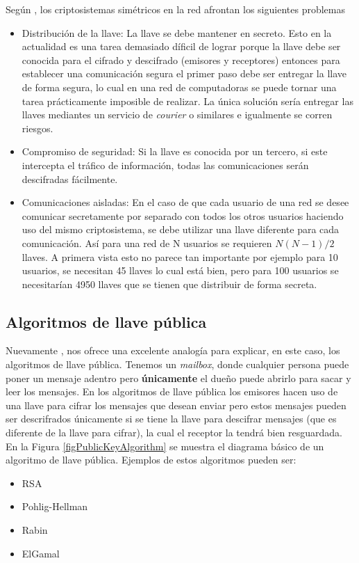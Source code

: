 Según \cite{bruce}, los criptosistemas simétricos en la red afrontan los siguientes problemas
\begin{itemize}
\item Distribución de la llave: La llave se debe mantener en secreto. Esto en la actualidad es una tarea demasiado díficil de lograr porque la llave debe ser conocida para el cifrado y descifrado (emisores y receptores) entonces para establecer una comunicación segura el primer paso debe ser entregar la llave de forma segura, lo cual en una red de computadoras se puede tornar una tarea prácticamente imposible de realizar. La única solución sería entregar las llaves mediantes un servicio de \textit{courier} o similares e igualmente se corren riesgos. 

\item Compromiso de seguridad: Si la llave es conocida por un tercero, si este intercepta el tráfico de información, todas las comunicaciones serán descifradas fácilmente.

\item Comunicaciones aisladas: En el caso de que cada usuario de una red se desee comunicar secretamente por separado con todos los otros usuarios haciendo uso del mismo criptosistema, se debe utilizar una llave diferente para cada comunicación. Así para una red de N usuarios se requieren $N(N - 1)/2$ llaves. A primera vista esto no parece tan importante por ejemplo para 10 usuarios, se necesitan 45 llaves lo cual está bien, pero para 100 usuarios se necesitarían 4950 llaves que se tienen que distribuir de forma secreta.
\end{itemize}



\subsection{Algoritmos de llave pública}
Nuevamente \cite{bruce}, nos ofrece una excelente analogía para explicar, en este caso, los algoritmos de llave pública. Tenemos un \textit{mailbox}, donde cualquier persona puede poner un mensaje adentro pero \textbf{únicamente} el dueño puede abrirlo para sacar y leer los mensajes.
\newline
\newline
En los algoritmos de llave pública los emisores hacen uso de una llave para cifrar los mensajes que desean enviar pero estos mensajes pueden ser descrifrados únicamente si se tiene la llave para descifrar mensajes (que es diferente de la llave para cifrar), la cual el receptor la tendrá bien resguardada. En la Figura \ref{figPublicKeyAlgorithm} se muestra el diagrama básico de un algoritmo de llave pública. Ejemplos de estos algoritmos pueden ser:
\begin{itemize}
\item RSA
\item Pohlig-Hellman
\item Rabin
\item ElGamal
\end{itemize}

